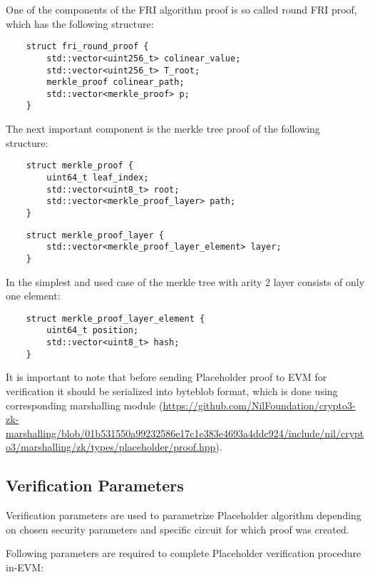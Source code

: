 One of the components of the FRI algorithm proof is so called round FRI proof, which has the following structure:

\begin{verbatim}
    struct fri_round_proof {
        std::vector<uint256_t> colinear_value;
        std::vector<uint256_t> T_root;
        merkle_proof colinear_path;
        std::vector<merkle_proof> p;
    }
\end{verbatim}

The next important component is the merkle tree proof of the following structure:

\begin{verbatim}
    struct merkle_proof {
        uint64_t leaf_index;
        std::vector<uint8_t> root;
        std::vector<merkle_proof_layer> path;
    }
\end{verbatim}

\begin{verbatim}
    struct merkle_proof_layer {
        std::vector<merkle_proof_layer_element> layer;
    }       
\end{verbatim}

In the simplest and used case of the merkle tree with arity 2 layer consists of only one element:

\begin{verbatim}
    struct merkle_proof_layer_element {
        uint64_t position;
        std::vector<uint8_t> hash;
    }
\end{verbatim}

It is important to note that before sending Placeholder proof to EVM for verification it should be serialized into byteblob format,
which is done using corresponding marshalling module 
(\url{https://github.com/NilFoundation/crypto3-zk-marshalling/blob/01b531550a99232586e17c1e383e4693a4ddc924/include/nil/crypto3/marshalling/zk/types/placeholder/proof.hpp}).

\subsection{Verification Parameters}

Verification parameters are used to parametrize Placeholder algorithm depending on chosen security parameters and specific circuit for which proof was created.

Following parameters are required to complete Placeholder verification procedure in-EVM:


